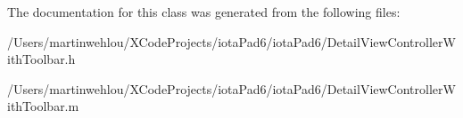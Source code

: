 The documentation for this class was generated from the following files:\begin{DoxyCompactItemize}
\item 
/Users/martinwehlou/XCodeProjects/iotaPad6/iotaPad6/DetailViewControllerWithToolbar.h\item 
/Users/martinwehlou/XCodeProjects/iotaPad6/iotaPad6/DetailViewControllerWithToolbar.m\end{DoxyCompactItemize}
